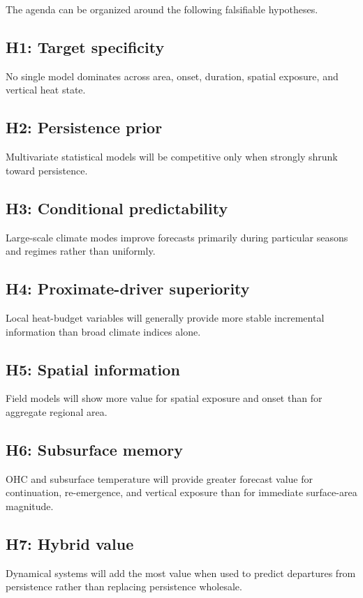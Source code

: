 \documentclass[11pt]{article}
\begin{document}
The agenda can be organized around the following falsifiable hypotheses.

\subsection*{H1: Target specificity}
No single model dominates across area, onset, duration, spatial exposure, and vertical heat state.

\subsection*{H2: Persistence prior}
Multivariate statistical models will be competitive only when strongly shrunk toward persistence.

\subsection*{H3: Conditional predictability}
Large-scale climate modes improve forecasts primarily during particular seasons and regimes rather than uniformly.

\subsection*{H4: Proximate-driver superiority}
Local heat-budget variables will generally provide more stable incremental information than broad climate indices alone.

\subsection*{H5: Spatial information}
Field models will show more value for spatial exposure and onset than for aggregate regional area.

\subsection*{H6: Subsurface memory}
OHC and subsurface temperature will provide greater forecast value for continuation, re-emergence, and vertical exposure than for immediate surface-area magnitude.

\subsection*{H7: Hybrid value}
Dynamical systems will add the most value when used to predict departures from persistence rather than replacing persistence wholesale.
\end{document}
